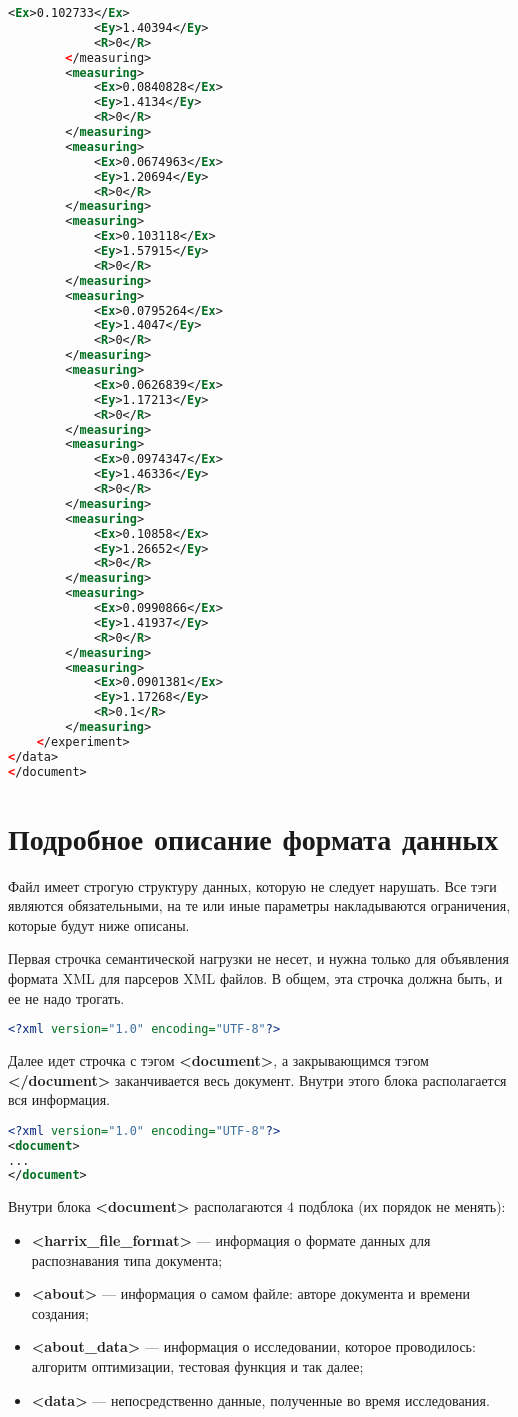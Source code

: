 \documentclass[a4paper,12pt]{article}
\begin{document}
\begin{lstlisting}[label=Example01, language=xml ,caption=Пример части файла Harrix Optimization Testing]
			<Ex>0.102733</Ex>
			<Ey>1.40394</Ey>
			<R>0</R>
		</measuring>
		<measuring>
			<Ex>0.0840828</Ex>
			<Ey>1.4134</Ey>
			<R>0</R>
		</measuring>
		<measuring>
			<Ex>0.0674963</Ex>
			<Ey>1.20694</Ey>
			<R>0</R>
		</measuring>
		<measuring>
			<Ex>0.103118</Ex>
			<Ey>1.57915</Ey>
			<R>0</R>
		</measuring>
		<measuring>
			<Ex>0.0795264</Ex>
			<Ey>1.4047</Ey>
			<R>0</R>
		</measuring>
		<measuring>
			<Ex>0.0626839</Ex>
			<Ey>1.17213</Ey>
			<R>0</R>
		</measuring>
		<measuring>
			<Ex>0.0974347</Ex>
			<Ey>1.46336</Ey>
			<R>0</R>
		</measuring>
		<measuring>
			<Ex>0.10858</Ex>
			<Ey>1.26652</Ey>
			<R>0</R>
		</measuring>
		<measuring>
			<Ex>0.0990866</Ex>
			<Ey>1.41937</Ey>
			<R>0</R>
		</measuring>
		<measuring>
			<Ex>0.0901381</Ex>
			<Ey>1.17268</Ey>
			<R>0.1</R>
		</measuring>
	</experiment>
</data>
</document>
\end{lstlisting}

\section{Подробное описание формата данных}

Файл имеет строгую структуру данных, которую не следует нарушать. Все тэги являются обязательными, на те или иные параметры накладываются ограничения, которые будут ниже описаны.

Первая строчка семантической нагрузки не несет, и нужна только для объявления формата XML для парсеров XML файлов. В общем, эта строчка должна быть, и ее не надо трогать.

\begin{lstlisting}[label=Part01, language=xml ,caption=Первая строчка файла Harrix Optimization Testing]
<?xml version="1.0" encoding="UTF-8"?>
\end{lstlisting}

Далее идет строчка с тэгом \textbf{<document>}, а закрывающимся тэгом \textbf{</document>} заканчивается весь документ. Внутри этого блока располагается вся информация.

\begin{lstlisting}[label=Part02, language=xml ,caption=Блок <document> в файле Harrix Optimization Testing]
<?xml version="1.0" encoding="UTF-8"?>
<document>
...
</document>
\end{lstlisting}

Внутри блока \textbf{<document>} располагаются $ 4 $ подблока (их порядок не менять):
\begin{itemize}
\item \textbf{<harrix\_file\_format>} --- информация о формате данных для распознавания типа документа;
\item \textbf{<about>} --- информация о самом файле:  авторе документа и времени создания;
\item \textbf{<about\_data>} --- информация о исследовании, которое проводилось: алгоритм оптимизации, тестовая функция и так далее;
\item \textbf{<data>} --- непосредственно данные, полученные во время исследования.
\end{itemize}
\end{document}
